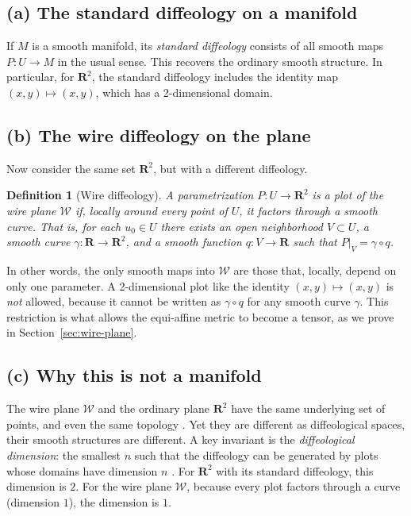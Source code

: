 \documentclass[10pt,letterpaper,reqno]{amsart}
\newcommand{\RR}{\mathbf{R}}
\newcommand{\cW}{\mathcal{W}}
\newtheorem*{definition}{Definition}
\begin{document}
  \subsection*{(a) The standard diffeology on a manifold}
  
  If $M$ is a smooth manifold, its \emph{standard diffeology} consists of all smooth maps $P: U \to M$ in the usual sense.
  This recovers the ordinary smooth structure.
  In particular, for $\RR^2$, the standard diffeology includes the identity map $(x,y) \mapsto (x,y)$,
  which has a 2-dimensional domain.
  
  \subsection*{(b) The wire diffeology on the plane}
  
  Now consider the same set $\RR^2$, but with a different diffeology.
  
  \begin{definition}[Wire diffeology]
    A parametrization $P: U \to \RR^2$ is a \emph{plot of the wire plane} $\cW$
    if, locally around every point of $U$,
    it factors through a smooth curve.
    That is, for each $u_0 \in U$ there exists an open neighborhood $V \subset U$,
    a smooth curve $\gamma: \RR \to \RR^2$,
    and a smooth function $q: V \to \RR$ such that $P|_V = \gamma \circ q$.
  \end{definition}
  
  In other words, the only smooth maps into $\cW$ are those that, locally, depend on only one parameter.
  A 2-dimensional plot like the identity $(x,y) \mapsto (x,y)$ is \emph{not} allowed,
  because it cannot be written as $\gamma \circ q$ for any smooth curve $\gamma$.
  This restriction is what allows the equi-affine metric to become a tensor, as we prove in Section~\ref{sec:wire-plane}.
  
  \subsection*{(c) Why this is not a manifold}
  
  The wire plane $\cW$ and the ordinary plane $\RR^2$ have the same underlying set of points,
  and even the same topology \cite{PIZ26}.
  Yet they are different as diffeological spaces,
  their smooth structures are different.
  A key invariant is the \emph{diffeological dimension}:
  the smallest $n$ such that the diffeology can be generated by plots whose domains have dimension $n$ \cite[\S 1.78]{PIZ13}.
  For $\RR^2$ with its standard diffeology, this dimension is $2$.
  For the wire plane $\cW$, because every plot factors through a curve (dimension $1$), the dimension is $1$.
  
\end{document}
